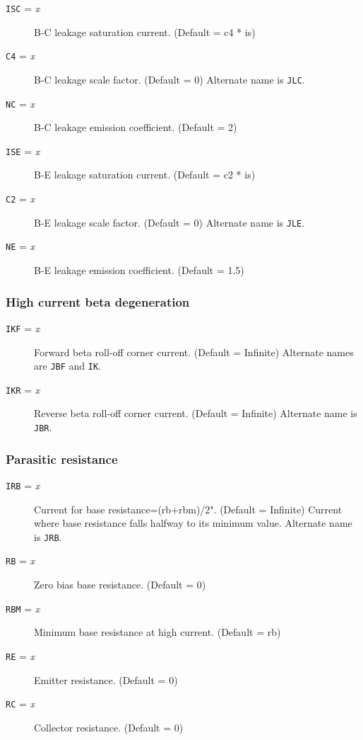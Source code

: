 \begin{description}

\item[{\tt ISC} = {\it x}]
B-C leakage saturation current.  (Default = c4 * is)

\item[{\tt C4} = {\it x}]
B-C leakage scale factor. (Default = 0)  Alternate name is {\tt JLC}.

\item[{\tt NC} = {\it x}]
B-C leakage emission coefficient.  (Default = 2)

\item[{\tt ISE} = {\it x}]
B-E leakage saturation current.  (Default = c2 * is)

\item[{\tt C2} = {\it x}]
B-E leakage scale factor.  (Default = 0)  Alternate name is {\tt JLE}.

\item[{\tt NE} = {\it x}]
B-E leakage emission coefficient.  (Default = 1.5)

\end{description}

\subsubsection{High current beta degeneration}

\begin{description}

\item[{\tt IKF} = {\it x}]
Forward beta roll-off corner current.  (Default = Infinite) Alternate
names are {\tt JBF} and {\tt IK}.

\item[{\tt IKR} = {\it x}]
Reverse beta roll-off corner current.  (Default = Infinite) Alternate
name is {\tt JBR}.

\end{description}

\subsubsection{Parasitic resistance}

\begin{description}

\item[{\tt IRB} = {\it x}]
Current for base resistance=(rb+rbm)/2".  (Default = Infinite) Current
where base resistance falls halfway to its minimum value. Alternate
name is {\tt JRB}.

\item[{\tt RB} = {\it x}]
Zero bias base resistance.  (Default = 0)

\item[{\tt RBM} = {\it x}]
Minimum base resistance at high current.  (Default = rb)

\item[{\tt RE} = {\it x}]
Emitter resistance.  (Default = 0)

\item[{\tt RC} = {\it x}]
Collector resistance.  (Default = 0)

\end{description}

